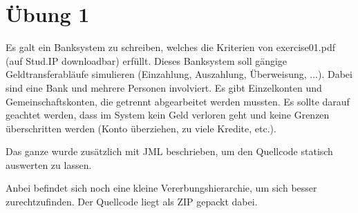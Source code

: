 \documentclass{fm}
\begin{document}
\section*{Übung 1}
Es galt ein Banksystem zu schreiben, welches die Kriterien von \glqq{}exercise01.pdf\grqq{} (auf Stud.IP downloadbar) erfüllt. Dieses Banksystem soll gängige Geldtransferabläufe simulieren (Einzahlung, Auszahlung, Überweisung, ...). Dabei sind eine Bank und mehrere Personen involviert. Es gibt Einzelkonten und Gemeinschaftskonten, die getrennt abgearbeitet werden mussten. Es sollte darauf geachtet werden, dass im System kein Geld verloren geht und keine Grenzen überschritten werden (Konto überziehen, zu viele Kredite, etc.).

Das ganze wurde zusätzlich mit JML beschrieben, um den Quellcode statisch auswerten zu lassen.

Anbei befindet sich noch eine kleine Vererbungshierarchie, um sich besser zurechtzufinden. Der Quellcode liegt als ZIP gepackt dabei.

\end{document}
